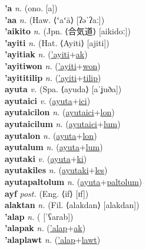 \textbf{'a} \textit{n.} (ono. [a])
 \label{'a} \\
\textbf{'aa} \textit{n.} (Haw. ⟨ʻaʻā⟩ [ʔəˈʔaː])
 \label{'aa} \\
\textbf{'aikito} \textit{n.} (Jpn. ⟨合気道⟩ [aikidoː])
 \label{'aikito} \\
\textbf{'ayiti} \textit{n.} (Hat. ⟨Ayiti⟩ [ajiti])
 \label{'ayiti} \\
\textbf{'ayitiak} \textit{n.} (\hyperref['ayiti]{'ayiti}+\hyperref[ak]{ak})
 \label{'ayitiak} \\
\textbf{'ayitiwon} \textit{n.} (\hyperref['ayiti]{'ayiti}+\hyperref[won]{won})
 \label{'ayitiwon} \\
\textbf{'ayititilip} \textit{n.} (\hyperref['ayiti]{'ayiti}+\hyperref[tilip]{tilip})
 \label{'ayititilip} \\
\textbf{ayuta} \textit{v.} (Spa. ⟨ayuda⟩ [aˈʝuða])
 \label{ayuta} \\
\textbf{ayutaici} \textit{v.} (\hyperref[ayuta]{ayuta}+\hyperref[ici]{ici})
 \label{ayutaici} \\
\textbf{ayutaicilon} \textit{n.} (\hyperref[ayutaici]{ayutaici}+\hyperref[lon]{lon})
 \label{ayutaicilon} \\
\textbf{ayutaicilum} \textit{n.} (\hyperref[ayutaici]{ayutaici}+\hyperref[lum]{lum})
 \label{ayutaicilum} \\
\textbf{ayutalon} \textit{n.} (\hyperref[ayuta]{ayuta}+\hyperref[lon]{lon})
 \label{ayutalon} \\
\textbf{ayutalum} \textit{n.} (\hyperref[ayuta]{ayuta}+\hyperref[lum]{lum})
 \label{ayutalum} \\
\textbf{ayutaki} \textit{v.} (\hyperref[ayuta]{ayuta}+\hyperref[ki]{ki})
 \label{ayutaki} \\
\textbf{ayutakiles} \textit{n.} (\hyperref[ayutaki]{ayutaki}+\hyperref[les]{les})
 \label{ayutakiles} \\
\textbf{ayutapaltolum} \textit{n.} (\hyperref[ayuta]{ayuta}+\hyperref[paltolum]{paltolum})
 \label{ayutapaltolum} \\
\textbf{ayf} \textit{post.} (Eng. ⟨if⟩ [ɪf])
 \label{ayf} \\
\textbf{alaktan} \textit{n.} (Fil. ⟨alakdan⟩ [alakdan])
 \label{alaktan} \\
\textbf{'alap} \textit{n.} ( [ˈʕarab])
 \label{'alap} \\
\textbf{'alapak} \textit{n.} (\hyperref['alap]{'alap}+\hyperref[ak]{ak})
 \label{'alapak} \\
\textbf{'alaplawt} \textit{n.} (\hyperref['alap]{'alap}+\hyperref[lawt]{lawt})
